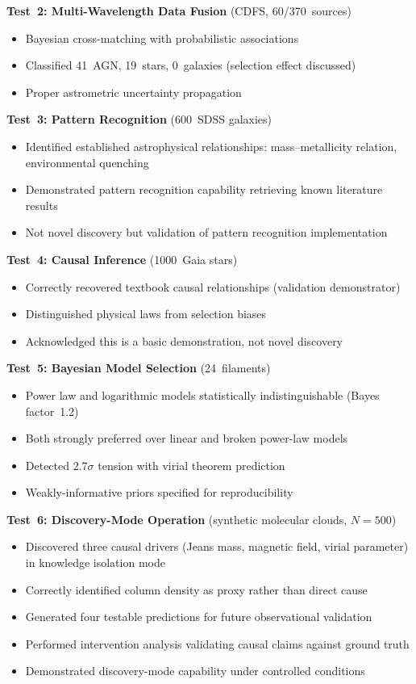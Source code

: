 \documentclass[fleqn,usenatbib]{mnras}
\begin{document}
\textbf{Test~2: Multi-Wavelength Data Fusion} (CDFS, 60/370~sources)
\begin{itemize}
  \item Bayesian cross-matching with probabilistic associations
  \item Classified 41~AGN, 19~stars, 0~galaxies (selection effect discussed)
  \item Proper astrometric uncertainty propagation
\end{itemize}

\textbf{Test~3: Pattern Recognition} (600~SDSS galaxies)
\begin{itemize}
  \item Identified established astrophysical relationships: mass--metallicity relation, environmental quenching
  \item Demonstrated pattern recognition capability retrieving known literature results
  \item Not novel discovery but validation of pattern recognition implementation
\end{itemize}

\textbf{Test~4: Causal Inference} (1000~Gaia stars)
\begin{itemize}
  \item Correctly recovered textbook causal relationships (validation demonstrator)
  \item Distinguished physical laws from selection biases
  \item Acknowledged this is a basic demonstration, not novel discovery
\end{itemize}

\textbf{Test~5: Bayesian Model Selection} (24~filaments)
\begin{itemize}
  \item Power law and logarithmic models statistically indistinguishable (Bayes factor~1.2)
  \item Both strongly preferred over linear and broken power-law models
  \item Detected $2.7\sigma$ tension with virial theorem prediction
  \item Weakly-informative priors specified for reproducibility
\end{itemize}

\textbf{Test~6: Discovery-Mode Operation} (synthetic molecular clouds, $N = 500$)
\begin{itemize}
  \item Discovered three causal drivers (Jeans mass, magnetic field, virial parameter) in knowledge isolation mode
  \item Correctly identified column density as proxy rather than direct cause
  \item Generated four testable predictions for future observational validation
  \item Performed intervention analysis validating causal claims against ground truth
  \item Demonstrated discovery-mode capability under controlled conditions
\end{itemize}
\end{document}
